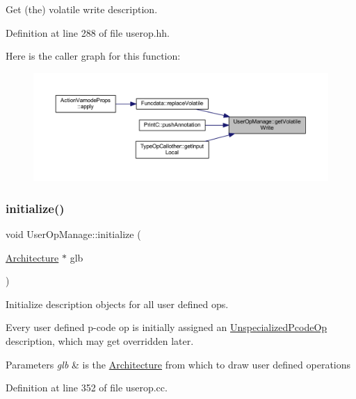 Get (the) volatile write description. 



Definition at line 288 of file userop.\+hh.

Here is the caller graph for this function\+:
\nopagebreak
\begin{figure}[H]
\begin{center}
\leavevmode
\includegraphics[width=350pt]{class_user_op_manage_a4ab2f5390f4f289a39328737615dce57_icgraph}
\end{center}
\end{figure}
\mbox{\label{class_user_op_manage_a3a4220cee8c82eb2a30b527bb952a4d6}} 
\subsubsection{\texorpdfstring{initialize()}{initialize()}}
{\footnotesize\ttfamily void User\+Op\+Manage\+::initialize (\begin{DoxyParamCaption}\item[{\mbox{\hyperlink{class_architecture}{Architecture}} $\ast$}]{glb }\end{DoxyParamCaption})}



Initialize description objects for all user defined ops. 

Every user defined p-\/code op is initially assigned an \mbox{\hyperlink{class_unspecialized_pcode_op}{Unspecialized\+Pcode\+Op}} description, which may get overridden later. 
\begin{DoxyParams}{Parameters}
{\em glb} & is the \mbox{\hyperlink{class_architecture}{Architecture}} from which to draw user defined operations \\
\hline
\end{DoxyParams}


Definition at line 352 of file userop.\+cc.

